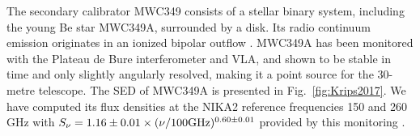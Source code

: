 


%

\label{se:fluxSec}

The secondary calibrator MWC349 consists of a stellar
binary system, including the young Be star MWC349A, surrounded by a
disk. Its radio continuum emission
originates in an ionized bipolar outflow \cite{Tafoya}.  MWC349A has
been monitored with the Plateau de Bure interferometer and VLA, and
shown to be stable in time and only slightly angularly resolved,
making it a point source for the 30-metre telescope. The SED of
MWC349A \cite{krips} is presented in Fig.~\ref{fig:Krips2017}. We have
computed its flux densities at the NIKA2 reference frequencies 150 and
260 GHz with $S_\nu = 1.16\pm0.01 \times
(\nu/100 \rm{GHz})^{0.60\pm0.01}$ provided by this
monitoring \cite{krips}.

